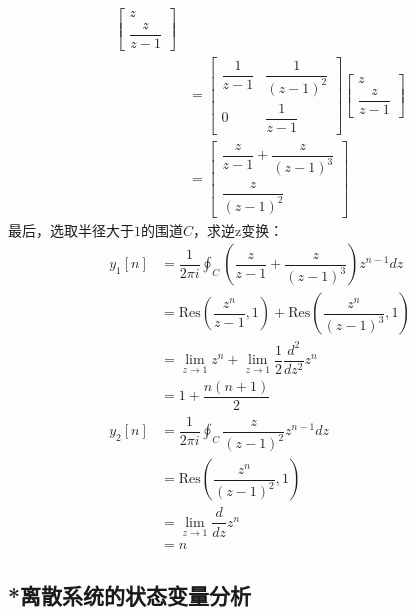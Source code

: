 \begin{example}
\begin{align*}
\begin{bmatrix}
            z\\
            \dfrac{z}{z-1}
        \end{bmatrix}\\
        & = \begin{bmatrix}
            \dfrac{1}{z-1} & \dfrac{1}{(z-1)^2}\\
            0 & \dfrac{1}{z-1}
        \end{bmatrix} \begin{bmatrix}
            z\\
            \dfrac{z}{z-1}
        \end{bmatrix}\\
        & = \begin{bmatrix}
            \dfrac{z}{z-1} + \dfrac{z}{(z-1)^3}\\
            \dfrac{z}{(z-1)^2}
        \end{bmatrix}
    \end{align*}
    最后，选取半径大于$1$的围道$C$，求逆z变换：\begin{align*}
        y_1[n] & = \dfrac{1}{2\pi i} \oint_C \left(\dfrac{z}{z-1} + \dfrac{z}{(z-1)^3}\right) z^{n-1} dz\\
        & = \mathrm{Res}\left(\dfrac{z^n}{z-1},1\right) + \mathrm{Res}\left(\dfrac{z^n}{(z-1)^3},1\right)\\
        &=\lim_{z\to 1}z^n+ \lim_{z\to 1} \dfrac{1}{2}\dfrac{d^2}{dz^2}z^n\\
        & = 1 + \dfrac{n(n+1)}{2}\\
        y_2[n] & = \dfrac{1}{2\pi i} \oint_C \dfrac{z}{(z-1)^2} z^{n-1} dz\\
        & = \mathrm{Res}\left(\dfrac{z^n}{(z-1)^2},1\right)\\
        &=\lim_{z\to 1} \dfrac{d}{dz} z^n\\
        & = n
    \end{align*}
\end{example}

\subsection{*离散系统的状态变量分析}\label{sub:discrete_state_variable}


